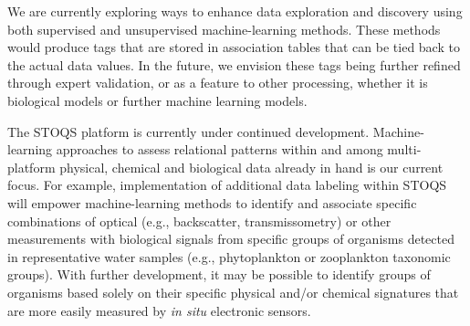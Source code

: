 \documentclass[conference]{IEEEtran}
\begin{document}
We are currently exploring ways to enhance data exploration and discovery using both supervised and unsupervised machine-learning methods.  These methods would produce tags that are stored in association tables that can be tied back to the actual data values.  In the future, we envision these tags being further refined through expert validation, or as a feature to other processing, whether it is biological models or further machine learning models. 

The STOQS platform is currently under continued development.  Machine-learning approaches to assess relational patterns within and among multi-platform physical, chemical and biological data already in hand is our current focus.  For example, implementation of additional data labeling within STOQS will empower machine-learning methods to identify and associate specific combinations of optical (e.g., backscatter, transmissometry) or other measurements with biological signals from specific groups of organisms detected in representative water samples (e.g., phytoplankton or zooplankton taxonomic groups). With further development, it may be possible to identify groups of organisms based solely on their specific physical and/or chemical signatures that are more easily measured by \textit{in situ} electronic sensors.






%
%
\end{document}
